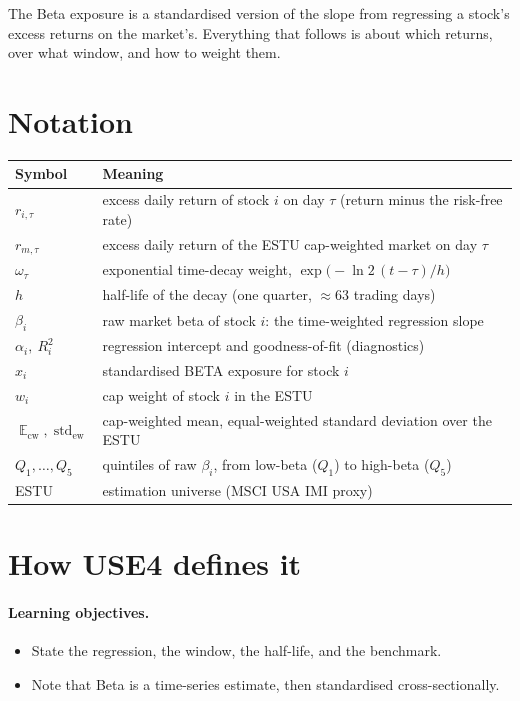 \documentclass[11pt]{article}
\theoremstyle{definition}
\theoremstyle{plain}
\theoremstyle{remark}
\DeclareMathOperator{\std}{std}
\DeclareMathOperator*{\avg}{\mathbb{E}}
\begin{document}
\begin{keyresult}
The Beta exposure is a standardised version of the slope from regressing a stock's excess returns on the market's. Everything that follows is about which returns, over what window, and how to weight them.
\end{keyresult}

\section*{Notation}

\begin{center}
\begin{tabular}{@{}ll@{}}
\toprule
Symbol & Meaning \\
\midrule
$r_{i,\tau}$ & excess daily return of stock $i$ on day $\tau$ (return minus the risk-free rate) \\
$r_{m,\tau}$ & excess daily return of the ESTU cap-weighted market on day $\tau$ \\
$\omega_\tau$ & exponential time-decay weight, $\exp\!\big(-\ln 2\,(t-\tau)/h\big)$ \\
$h$ & half-life of the decay (one quarter, $\approx 63$ trading days) \\
$\beta_i$ & raw market beta of stock $i$: the time-weighted regression slope \\
$\alpha_i,\ R^2_i$ & regression intercept and goodness-of-fit (diagnostics) \\
$x_i$ & standardised BETA exposure for stock $i$ \\
$w_i$ & cap weight of stock $i$ in the ESTU \\
$\avg_{\text{cw}}, \std_{\text{ew}}$ & cap-weighted mean, equal-weighted standard deviation over the ESTU \\
$Q_1,\dots,Q_5$ & quintiles of raw $\beta_i$, from low-beta ($Q_1$) to high-beta ($Q_5$) \\
ESTU & estimation universe (MSCI USA IMI proxy) \\
\bottomrule
\end{tabular}
\end{center}

\section{How USE4 defines it}\label{sec:def}

\paragraph{Learning objectives.}
\begin{itemize}[leftmargin=1.4em,topsep=2pt]
  \item State the regression, the window, the half-life, and the benchmark.
  \item Note that Beta is a time-series estimate, then standardised cross-sectionally.
\end{itemize}
\end{document}
